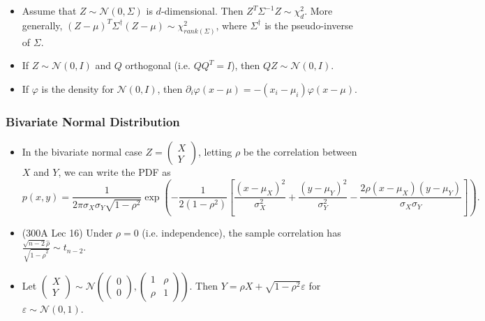 \documentclass[twoside]{article}
\newcommand\calN{\mathcal{N}}
\def\eps{\varepsilon}
\newcommand\sg{\sigma}
\newcommand\Sg{\Sigma}
\begin{document}
\begin{itemize}
\item Assume that $Z \sim \calN(0, \Sg)$ is $d$-dimensional. Then $Z^T \Sg^{-1} Z \sim \chi_d^2$. More generally, $(Z - \mu)^T \Sg^\dagger (Z - \mu) \sim \chi_{rank(\Sg)}^2$, where $\Sg^\dagger$ is the pseudo-inverse of $\Sg$.

\item If $Z \sim \calN(0,I)$ and $Q$ orthogonal (i.e. $QQ^T = I$), then $QZ \sim \calN(0, I)$.

\item If $\varphi$ is the density for $\calN(0, I)$, then $\partial_i \varphi(x - \mu) = -(x_i - \mu_i) \varphi(x - \mu)$.
\end{itemize}

\subsubsection{Bivariate Normal Distribution}
\begin{itemize}
\item In the bivariate normal case $Z = \begin{pmatrix} X \\ Y \end{pmatrix}$, letting $\rho$ be the correlation between $X$ and $Y$, we can write the PDF as
\begin{equation*}
p(x,y) = \frac{1}{2\pi \sg_X \sg_Y \sqrt{1 - \rho^2}} \exp \left( - \frac{1}{2(1-\rho^2)} \left[ \frac{(x - \mu_X)^2}{\sg_X^2} + \frac{(y - \mu_Y)^2}{\sg_Y^2} - \frac{2 \rho (x-\mu_X)(y - \mu_Y)}{\sg_X \sg_Y} \right] \right).
\end{equation*}

\item (300A Lec 16) Under $\rho = 0$ (i.e. independence), the sample correlation has $\displaystyle\frac{\sqrt{n-2} \hat{\rho}}{\sqrt{1 - \hat{\rho}^2}} \sim t_{n-2}$.

\item Let $\begin{pmatrix} X \\ Y \end{pmatrix} \sim \calN \left( \begin{pmatrix} 0 \\ 0 \end{pmatrix}, \begin{pmatrix} 1 & \rho \\ \rho & 1 \end{pmatrix} \right)$. Then $Y = \rho X + \sqrt{1 - \rho^2} \eps$ for $\eps \sim \calN(0,1)$.
\end{itemize}
\end{document}

